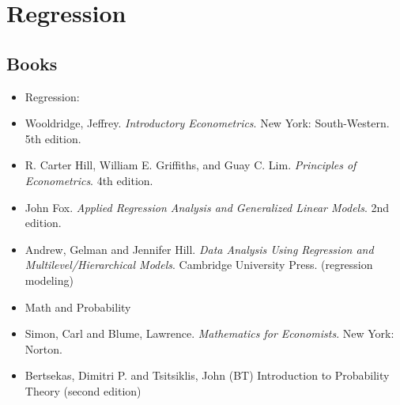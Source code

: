 \documentclass{article}
\begin{document}
\clearpage

\setcounter{section}{0}
\section*{Regression}
\subsection*{Books}

\begin{itemize}	
\item[] Regression:
\item Wooldridge, Jeffrey. \emph{Introductory Econometrics}. New York: South-Western. 5th edition.
\item R. Carter Hill, William E. Griffiths, and Guay C. Lim. \emph{Principles of Econometrics}. 4th edition.
\item John Fox. \emph{Applied Regression Analysis and Generalized Linear Models}. 2nd edition.
\item Andrew, Gelman and Jennifer Hill. \emph{Data Analysis Using Regression and Multilevel/Hierarchical Models}. Cambridge University Press. (regression modeling)
\item[] Math and Probability
\item Simon, Carl and Blume, Lawrence. \emph{Mathematics for Economists}. New York: Norton.
\item  Bertsekas, Dimitri P. and Tsitsiklis, John (BT) Introduction to Probability Theory (second edition)


\end{itemize}
\end{document}
